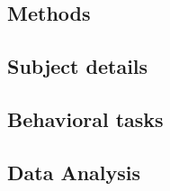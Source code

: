 \documentclass[9pt,biorxiv,lineno,onehalfspacing]{lapreprint}
\begin{document}
\begin{refsection}
\newpage
\section{Methods}
\subsection{Subject details}

\subsection{Behavioral tasks}

\subsection{Data Analysis}


\begin{appendix}

\begin{appendixbox}\label{app:IndDiffs}
    
\end{appendixbox}

\begin{appendixbox}\label{app:SatBias}
    
\end{appendixbox}

\begin{appendixbox}\label{app:LongAnal}
    
\end{appendixbox}



\end{appendix}

\clearpage
\printbibliography[title=Additional References]
\end{refsection}


\end{document}

